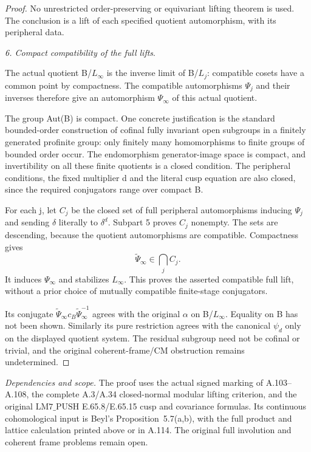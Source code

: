 \begin{proof}
No unrestricted order-preserving or equivariant lifting theorem is used. The conclusion is a lift of each specified quotient automorphism, with its peripheral data.

\medskip\noindent\emph{6. Compact compatibility of the full lifts}.

The actual quotient B/\(L_\infty\) is the inverse limit of B/\(L_j\): compatible cosets have a common point by compactness. The compatible automorphisms \(\Psi_j\) and their inverses therefore give an automorphism \(\Psi_\infty\) of this actual quotient.

The group Aut(B) is compact. One concrete justification is the standard bounded-order construction of cofinal fully invariant open subgroups in a finitely generated profinite group: only finitely many homomorphisms to finite groups of bounded order occur. The endomorphism generator-image space is compact, and invertibility on all these finite quotients is a closed condition. The peripheral conditions, the fixed multiplier d and the literal cusp equation are also closed, since the required conjugators range over compact B.

For each j, let \(C_j\) be the closed set of full peripheral automorphisms inducing \(\Psi_j\) and sending \(\delta\) literally to \(\delta^d\). Subpart 5 proves \(C_j\) nonempty. The sets are descending, because the quotient automorphisms are compatible. Compactness gives
\[
\widetilde\Psi_\infty\in\bigcap_j C_j.
\]
It induces \(\Psi_\infty\) and stabilizes \(L_\infty\). This proves the asserted compatible full lift, without a prior choice of mutually compatible finite-stage conjugators.

Its conjugate \(\widetilde\Psi_\infty c_B\widetilde\Psi_\infty^{-1}\) agrees with the original \(\alpha\) on B/\(L_\infty\). Equality on B has not been shown. Similarly its pure restriction agrees with the canonical \(\psi_d\) only on the displayed quotient system. The residual subgroup need not be cofinal or trivial, and the original coherent-frame/CM obstruction remains undetermined.

\end{proof}
\noindent\emph{Dependencies and scope.}
The proof uses the actual signed marking of A.103--A.108,
the complete A.3/A.34 closed-normal modular lifting criterion,
and the original \(\mathrm{LM7\_PUSH}\) E.65.8/E.65.15 cusp and covariance
formulas. Its continuous cohomological input is Beyl's Proposition~5.7(a,b),
with the full product and lattice calculation printed above or in A.114.
The original full involution and coherent frame problems remain open.
